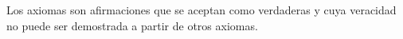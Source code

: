 \noindent Los axiomas son afirmaciones que se aceptan como verdaderas y cuya veracidad no puede ser demostrada a partir de otros axiomas.\cite{Definición_de_axioma}